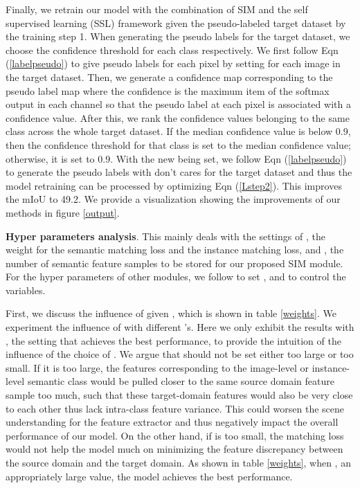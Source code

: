 \documentclass[10pt,twocolumn,letterpaper]{article}
\begin{document}
Finally, we retrain our model with the combination of SIM and the self supervised learning (SSL) framework given the pseudo-labeled target dataset by the training step 1. When generating the pseudo labels for the target dataset, we choose the confidence threshold for each class respectively. We first follow Eqn (\ref{labelpseudo}) to give pseudo labels for each pixel by setting  for each image in the target dataset. Then, we generate a confidence map corresponding to the pseudo label map where the confidence is the maximum item of the softmax output in each channel so that the pseudo label at each pixel is associated with a confidence value. After this, we rank the confidence values belonging to the same class across the whole target dataset. If the median confidence value is below 0.9, then the confidence threshold for that class is set to the median confidence value; otherwise, it is set to 0.9. With the new  being set, we follow Eqn (\ref{labelpseudo}) to generate the pseudo labels with don't cares for the target dataset and thus the model retraining can be processed by optimizing Eqn (\ref{Lstep2}). This improves the mIoU to 49.2. 
We provide a visualization showing the improvements of our methods in figure \ref{output}.



\textbf{Hyper parameters analysis}. This mainly deals with the settings of , the weight for the semantic matching loss and the instance matching loss, and , the number of semantic feature samples to be stored for our proposed SIM module. For the hyper parameters of other modules, we follow \cite{outputspace} to set ,  and  to control the variables. 

First, we discuss the influence of  given , which is shown in table \ref{weights}. We experiment the influence of  with different 's. Here we only exhibit the results with , the setting that achieves the best performance, to provide the intuition of the influence of the choice of . We argue that  should not be set either too large or too small. If it is too large, the features corresponding to the image-level or instance-level semantic class would be pulled closer to the same source domain feature sample too much, such that these target-domain features would also be very close to each other thus lack intra-class feature variance. This could worsen the scene understanding for the feature extractor and thus negatively impact the overall performance of our model. On the other hand, if  is too small, the matching loss would not help the model much on minimizing the feature discrepancy between the source domain and the target domain. As shown in table \ref{weights}, when , an appropriately large value, the model achieves the best performance. 
\end{document}
